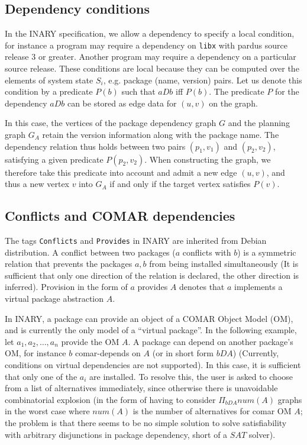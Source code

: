 \documentclass[a4paper,11pt]{article}
\begin{document}
\subsection{Dependency conditions}

In the INARY specification, we allow a dependency to specify a local
condition, for instance a program may require a dependency on
\texttt{libx} with pardus source release $3$ or greater. Another
program may require a dependency on a particular source release. These
conditions are local because they can be computed over the elements of
system state $S_i$, e.g. package (name, version) pairs. Let us denote this
condition by a predicate $P(b)$ such that $aDb$ iff $P(b)$.  The
predicate $P$ for the dependency $aDb$ can be stored as edge data for
$(u,v)$ on the graph.

In this case, the vertices of the package dependency graph $G$ and the
planning graph $G_A$ retain the version information along with the
package name. The dependency relation thus holds between two pairs
$(p_1,v_1)$ and $(p_2,v_2)$, satisfying a given predicate
$P(p_2,v_2)$. When constructing the graph, we therefore take this
predicate into account and admit a new edge $(u,v)$, and thus a new
vertex $v$ into $G_A$ if and only if the target vertex satisfies
$P(v)$.

\subsection{Conflicts and COMAR dependencies}

The tags \texttt{Conflicts} and \texttt{Provides} in INARY are
inherited from Debian distribution. A conflict between two packages
($a$ conflicts with $b$) is a symmetric relation that prevents the
packages $a,b$ from being installed simultaneously (It is
sufficient that only one direction of the relation is declared, the
other direction is inferred). Provision in the form of $a$ provides $A$
denotes that $a$ implements a virtual package abstraction $A$.

In INARY, a package can provide an object of a COMAR Object Model (OM),
and is currently the only model of a ``virtual package''. In the
following example, let $a_1,a_2,\ldots,a_n$ provide the OM $A$. A package
can depend on another package's OM, for instance $b$ comar-depends on
$A$ (or in short form $bDA$) (Currently, conditions on virtual
dependencies are not supported). In this case, it is sufficient that
only one of the $a_i$ are installed. To resolve this, the user is
asked to choose from a list of alternatives immediately, since
otherwise there is unavoidable combinatorial explosion (in the form of
having to consider $\Pi_{bDA}num(A)$ graphs in the worst case where
$num(A)$ is the number of alternatives for comar OM $A$; the problem
is that there seems to be no simple solution to solve satisfiability
with arbitrary disjunctions in package dependency, short of a $SAT$
solver).
\end{document}
